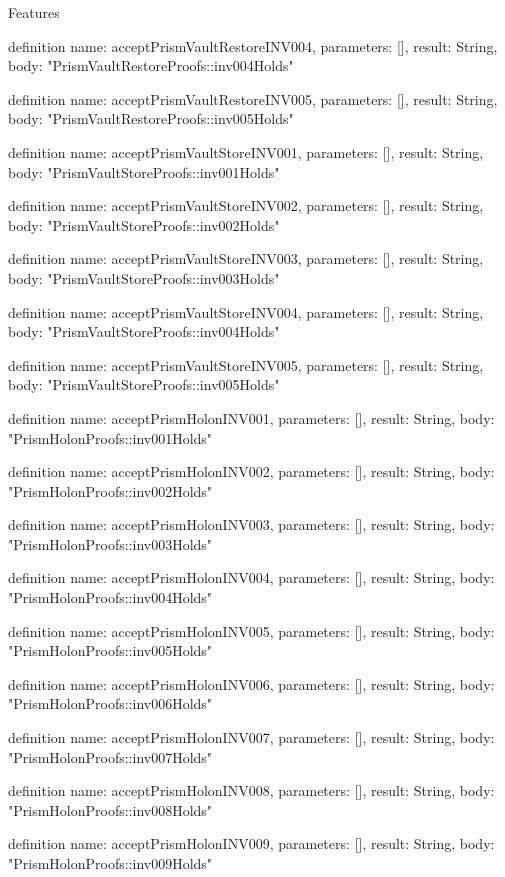 \begin{lexlean}{Features}
\begin{semanticmodule}
definition{
  name: acceptPrismVaultRestoreINV004,
  parameters: [],
  result: String,
  body: "PrismVaultRestoreProofs::inv004Holds"
}

definition{
  name: acceptPrismVaultRestoreINV005,
  parameters: [],
  result: String,
  body: "PrismVaultRestoreProofs::inv005Holds"
}

definition{
  name: acceptPrismVaultStoreINV001,
  parameters: [],
  result: String,
  body: "PrismVaultStoreProofs::inv001Holds"
}

definition{
  name: acceptPrismVaultStoreINV002,
  parameters: [],
  result: String,
  body: "PrismVaultStoreProofs::inv002Holds"
}

definition{
  name: acceptPrismVaultStoreINV003,
  parameters: [],
  result: String,
  body: "PrismVaultStoreProofs::inv003Holds"
}

definition{
  name: acceptPrismVaultStoreINV004,
  parameters: [],
  result: String,
  body: "PrismVaultStoreProofs::inv004Holds"
}

definition{
  name: acceptPrismVaultStoreINV005,
  parameters: [],
  result: String,
  body: "PrismVaultStoreProofs::inv005Holds"
}

definition{
  name: acceptPrismHolonINV001,
  parameters: [],
  result: String,
  body: "PrismHolonProofs::inv001Holds"
}

definition{
  name: acceptPrismHolonINV002,
  parameters: [],
  result: String,
  body: "PrismHolonProofs::inv002Holds"
}

definition{
  name: acceptPrismHolonINV003,
  parameters: [],
  result: String,
  body: "PrismHolonProofs::inv003Holds"
}

definition{
  name: acceptPrismHolonINV004,
  parameters: [],
  result: String,
  body: "PrismHolonProofs::inv004Holds"
}

definition{
  name: acceptPrismHolonINV005,
  parameters: [],
  result: String,
  body: "PrismHolonProofs::inv005Holds"
}

definition{
  name: acceptPrismHolonINV006,
  parameters: [],
  result: String,
  body: "PrismHolonProofs::inv006Holds"
}

definition{
  name: acceptPrismHolonINV007,
  parameters: [],
  result: String,
  body: "PrismHolonProofs::inv007Holds"
}

definition{
  name: acceptPrismHolonINV008,
  parameters: [],
  result: String,
  body: "PrismHolonProofs::inv008Holds"
}

definition{
  name: acceptPrismHolonINV009,
  parameters: [],
  result: String,
  body: "PrismHolonProofs::inv009Holds"
}


\end{semanticmodule}
\end{lexlean}
